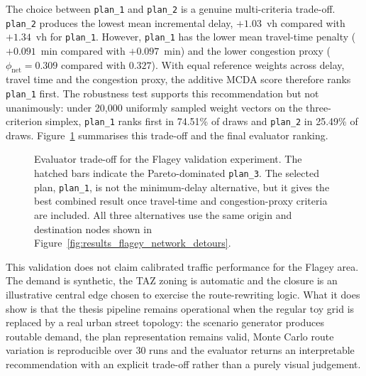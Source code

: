 The choice between \texttt{plan\_1} and \texttt{plan\_2} is a genuine
multi-criteria trade-off. \texttt{plan\_2} produces the lowest mean
incremental delay, $+1.03$~vh compared with $+1.34$~vh for
\texttt{plan\_1}. However, \texttt{plan\_1} has the lower mean travel-time
penalty ($+0.091$~min compared with $+0.097$~min) and the lower congestion
proxy ($\phi_\text{net}=0.309$ compared with $0.327$). With equal reference
weights across delay, travel time and the congestion proxy, the additive MCDA
score therefore ranks \texttt{plan\_1} first. The robustness test supports
this recommendation but not unanimously: under 20,000 uniformly sampled
weight vectors on the three-criterion simplex, \texttt{plan\_1} ranks first
in 74.51\% of draws and \texttt{plan\_2} in 25.49\% of draws.
Figure~\ref{fig:results_flagey_decision_summary} summarises this trade-off and
the final evaluator ranking.

\begin{figure}[H]
  \centering
  \caption{Evaluator trade-off for the Flagey validation experiment. The
  hatched bars indicate the Pareto-dominated \texttt{plan\_3}. The selected
  plan, \texttt{plan\_1}, is not the minimum-delay alternative, but it gives
  the best combined result once travel-time and congestion-proxy criteria are
  included. All three alternatives use the same origin and destination nodes
  shown in Figure~\ref{fig:results_flagey_network_detours}.}
  \label{fig:results_flagey_decision_summary}
\end{figure}

This validation does not claim calibrated traffic performance for the Flagey
area. The demand is synthetic, the TAZ zoning is automatic and the closure is
an illustrative central edge chosen to exercise the route-rewriting logic.
What it does show is that the thesis pipeline remains operational when the
regular toy grid is replaced by a real urban street topology: the scenario
generator produces routable demand, the plan representation remains valid,
Monte Carlo route variation is reproducible over 30 runs and the evaluator
returns an interpretable recommendation with an explicit trade-off rather than
a purely visual judgement.

\clearpage
